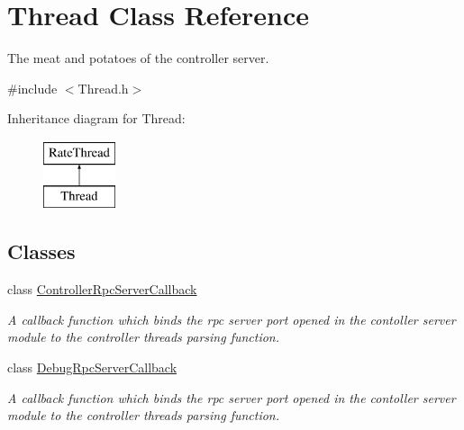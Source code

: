 \hypertarget{classThread}{}\section{Thread Class Reference}
\label{classThread}


The meat and potatoes of the controller server.  




{\ttfamily \#include $<$Thread.\+h$>$}

Inheritance diagram for Thread\+:\begin{figure}[H]
\begin{center}
\leavevmode
\includegraphics[height=2.000000cm]{classThread}
\end{center}
\end{figure}
\subsection*{Classes}
\begin{DoxyCompactItemize}
\item 
class \hyperlink{classThread_1_1ControllerRpcServerCallback}{Controller\+Rpc\+Server\+Callback}
\begin{DoxyCompactList}\small\item\em A callback function which binds the rpc server port opened in the contoller server module to the controller thread\textquotesingle{}s parsing function. \end{DoxyCompactList}\item 
class \hyperlink{classThread_1_1DebugRpcServerCallback}{Debug\+Rpc\+Server\+Callback}
\begin{DoxyCompactList}\small\item\em A callback function which binds the rpc server port opened in the contoller server module to the controller thread\textquotesingle{}s parsing function. \end{DoxyCompactList}\end{DoxyCompactItemize}
